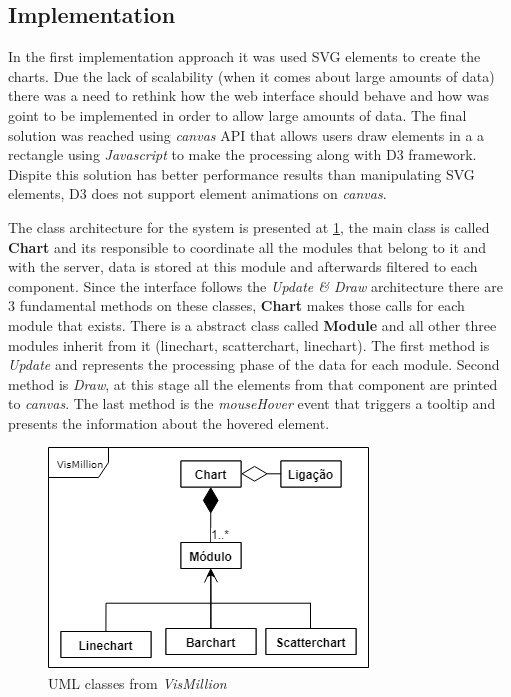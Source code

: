 \documentclass[letterpaper, 10 pt, conference]{ieeeconf}  %
\begin{document}
\subsection{Implementation}
\label{subsection:implementation}
In the first implementation approach it was used SVG elements to create the charts. Due the lack of scalability (when it comes about large amounts of data) there was a need to rethink how the web interface should behave and how was goint to be implemented in order to allow large amounts of data. The final solution was reached using \textit{canvas} API that allows users draw elements in a a rectangle using \textit{Javascript} to make the processing along with D3 framework. Dispite this solution has better performance results than manipulating SVG elements, D3 does not support element animations on \textit{canvas}. 

The class architecture for the system is presented at \ref{fig:uml}, the main class is called \textbf{Chart} and its responsible to coordinate all the modules that belong to it and with the server, data is stored at this module and afterwards filtered to each component. Since the interface follows the \textit{Update \& Draw} architecture there are 3 fundamental methods on these classes, \textbf{Chart} makes those calls for each module that exists. There is a abstract class called \textbf{Module} and all other three modules inherit from it (linechart, scatterchart, linechart). The first method is \textit{Update} and represents the processing phase of the data for each module. Second method is \textit{Draw}, at this stage all the elements from that component are printed to \textit{canvas}. The last method is the \textit{mouseHover} event that triggers a tooltip and presents the information about the hovered element. 

\begin{figure}[h]
    \centering
    \includegraphics[width=0.8\linewidth]{Figures/uml.png}
    \caption{UML classes from \textit{VisMillion}}
        \label{fig:uml}
\end{figure}
\end{document}
